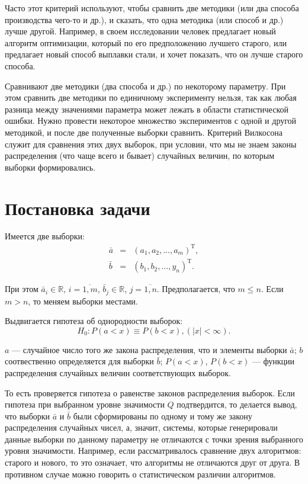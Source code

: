 \documentclass[a4paper,12pt]{article}
\begin{document}
Часто этот критерий используют, чтобы сравнить две методики (или два способа производства чего-то и др.), и  сказать, что одна методика (или способ и др.)  лучше другой. Например, в своем исследовании человек предлагает новый алгоритм оптимизации, который по его предположению лучшего старого, или предлагает новый способ выплавки стали, и хочет показать, что он лучше старого способа.

Сравнивают две методики (два способа и др.) по некоторому параметру. При этом сравнить две методики по единичному эксперименту нельзя, так как любая разница между значениями параметра может лежать в области статистической ошибки. Нужно провести некоторое множество экспериментов с одной и другой методикой, и после две полученные выборки сравнить. Критерий Вилкосона служит для сравнения этих двух выборок, при условии, что мы не знаем законы распределения (что чаще всего и бывает) случайных величин, по которым выборки формировались.

\section{Постановка задачи}

Имеется две выборки:
\begin{eqnarray}
\bar{a} &=& \left(  a_1, a_2, \ldots, a_m\right)^\mathrm{T} ,\\
\bar{b} &=& \left(  b_1, b_2, \ldots, y_n\right)^\mathrm{T} .\nonumber
\end{eqnarray}

При этом $\bar{a}_i\in \mathbb{R}$, $i=\overline{1,m}$, $\bar{b}_j\in \mathbb{R}$, $j=\overline{1,n}$. Предполагается, что $m\leq n$. Если $m > n$, то меняем выборки местами.

Выдвигается гипотеза об однородности выборок:
\begin{equation}
H_0: P(a<x)\equiv P(b<x), \left( \left| x \right| <  \infty \right). 
\end{equation}

$a$ --- случайное число того же закона распределения, что и элементы выборки $\bar{a}$; $b$ соотвественно определяется для выборки $\bar{b}$; $P(a<x)$, $P(b<x)$ --- функции распределения случайных величин соответствующих выборок.

То есть проверяется гипотеза о равенстве законов распределения выборок. Если гипотеза при выбранном уровне значимости $ Q $ подтвердится, то делается вывод, что выборки $\bar{a}$ и $\bar{b}$ были сформированы по одному и тому же закону распределения случайных чисел, а, значит, системы, которые генерировали данные выборки по данному параметру не отличаются с точки зрения выбранного уровня значимости. Например, если рассматривалось сравнение двух алгоритмов: старого и нового, то это означает, что алгоритмы не отличаются друг от друга. В противном случае можно говорить о статистическом различии алгоритмов.
\end{document}

